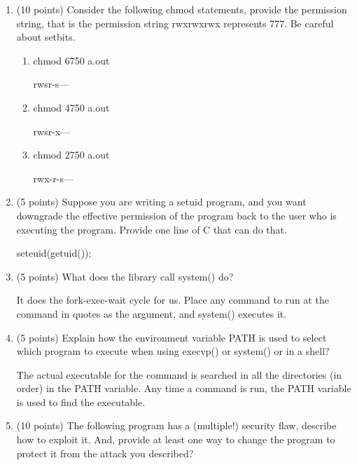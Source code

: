 \documentclass{article}[9pt]
\newenvironment{myanswer}{\begin{mdframed}\begin{answerfont}}{\end{answerfont}\end{mdframed}}
\begin{document}
\begin{enumerate}
\begin{enumerate}
\end{enumerate}
\item (10 points) Consider the following chmod statements, provide the
permission string, that is the permission string rwxrwxrwx
represents 777. Be careful about setbits.

\begin{enumerate}
\item chmod 6750 a.out
\begin{myanswer}
rwsr-s---
\end{myanswer}

\item chmod 4750 a.out
\begin{myanswer}
rwsr-x---
\end{myanswer}

\item chmod 2750 a.out
\begin{myanswer}
rwx-r-s---
\end{myanswer}

\end{enumerate}
\item (5 points) Suppose you are writing a setuid program, and you want
downgrade the effective permission of the program back to the
user who is executing the program. Provide one line of C that
can do that.
\begin{myanswer}
seteuid(getuid());
\end{myanswer}

\item (5 points) What does the library call system() do?
\begin{myanswer}
It does the fork-exec-wait cycle for us.  Place any command to run at
the command in quotes as the argument, and system() executes it.
\end{myanswer}

\item (5 points) Explain how the environment variable PATH is used to select
which program to execute when using execvp() or system() or in a shell?
\begin{myanswer}
The actual executable for the command is searched in all the directories
(in order) in the PATH variable.  Any time a command is run, the PATH
variable is used to find the executable.
\end{myanswer}

\item 
(10 points)  The following program has a (multiple!) security flaw, describe
how to exploit it. And, provide at least one way to change the
program to protect it from the attack you described?




\end{enumerate}
\end{document}
